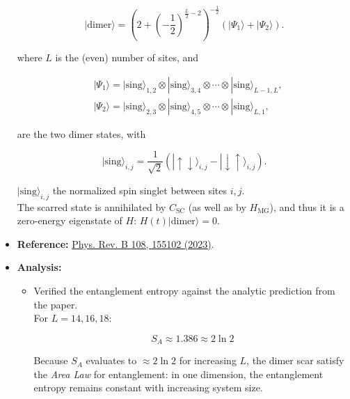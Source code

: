 \documentclass[11pt]{article}
\begin{document}
\begin{itemize}
    \begin{equation}
    | \text{dimer} \rangle = \left( 2 + \left( -\frac{1}{2} \right)^{\frac{L}{2} - 2} \right)^{-\frac{1}{2}} \left( |\Psi_1\rangle + |\Psi_2\rangle \right).
    \end{equation}

    where $L$ is the (even) number of sites, and
    
    \begin{align}
    &|\Psi_1\rangle = | \text{sing} \rangle_{1,2} \otimes | \text{sing} \rangle_{3,4} \otimes \cdots \otimes | \text{sing} \rangle_{L-1,L}, \\
    &|\Psi_2\rangle = | \text{sing} \rangle_{2,3} \otimes | \text{sing} \rangle_{4,5} \otimes \cdots \otimes | \text{sing} \rangle_{L,1},
    \end{align}
    
    are the two dimer states, with
    
    \begin{equation}
    | \text{sing} \rangle_{i,j} = \frac{1}{\sqrt{2}} \left( | \uparrow \downarrow \rangle_{i,j} - | \downarrow \uparrow \rangle_{i,j} \right).
    \end{equation}
    
    $| \text{sing} \rangle_{i,j}$ the normalized spin singlet between sites $i,j$.\\
    The scarred state is annihilated by $C_{\text{SC}}$ (as well as by $H_{\text{MG}}$), and thus it is a zero-energy eigenstate of $H$: $H(t)| \text{dimer} \rangle = 0$.
       
    \item \textbf{Reference:} \href{https://journals.aps.org/prb/abstract/10.1103/PhysRevB.108.155102}{Phys. Rev. B 108, 155102 (2023)}.
    \item \textbf{Analysis:}
    \begin{itemize}
        \item Verified the entanglement entropy against the analytic prediction from the paper.\\ For $L=14,16,18$:
        
        \begin{equation}
        S_A \approx 1.386 \approx 2 \ln 2
        \end{equation}
        
        Because $S_A$ evaluates to $\approx 2 \ln 2$ for increasing $L$, the dimer scar satisfy the \textit{Area Law} for entanglement: in one dimension, the entanglement entropy remains constant with increasing system size.
        

\end{itemize}
\end{itemize}
\end{document}
